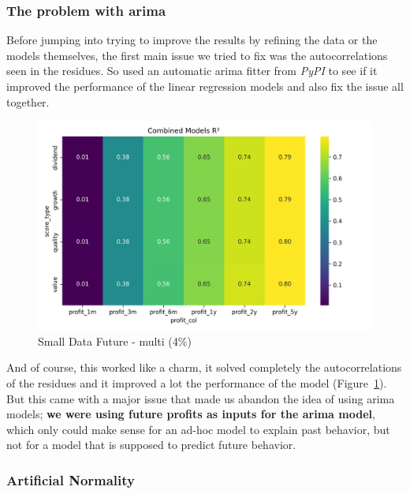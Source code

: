 \documentclass[11pt,english,a4paper,hidelinks]{book}
\begin{document}
\subsubsection{The problem with \acrshort{arima}}

\noindent Before jumping into trying to improve the results by refining the data or the models themselves, the first main issue we tried to fix was the autocorrelations seen in the residues. So used an automatic \acrshort{arima} fitter from \textit{PyPI} \textcite{pmdarima2025} to see if it improved the performance of the linear regression models and also fix the issue all together.

\begin{figure}[H]
    \centering
    \includegraphics[width=1\textwidth]{images/code/models/linear_regression/ARIMA_performance.png}
    \caption{Small Data Future - \acrshort{multi} (4\%)}
    \label{fig:arima_linear_regression}
\end{figure}

\noindent And of course, this worked like a charm, it solved completely the autocorrelations of the residues and it improved a lot the performance of the model (Figure~\ref{fig:arima_linear_regression}). But this came with a major issue that made us abandon the idea of using \acrshort{arima} models; \textbf{we were using future profits as inputs for the \acrshort{arima} model}, which only could make sense for an ad-hoc model to explain past behavior, but not for a model that is supposed to predict future behavior.

\subsubsection{Artificial Normality}
\end{document}
